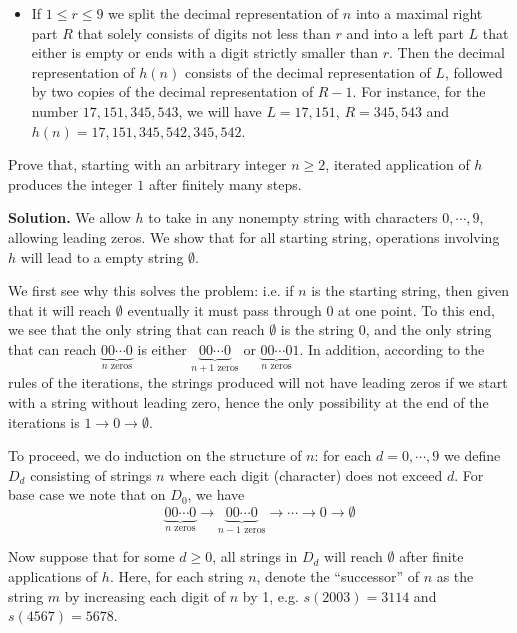 \documentclass[11pt,a4paper]{article}
\begin{document}
\begin{enumerate}
\begin{itemize}
    		\item If $1\leq r \leq 9$ we split the decimal representation of $n$ into a maximal right part $R$ that solely consists of digits not less than $r$ and into a left part $L$ that either is empty or ends with a digit strictly smaller than $r$. Then the decimal representation of $h(n)$ consists of the decimal representation of $L$, followed by two copies of the decimal representation of $R-1$. For instance, for the number $17,151,345,543$, we will have $L=17,151$, $R=345,543$ and $h(n)=17,151,345,542,345,542$.
    	\end{itemize}
        
        Prove that, starting with an arbitrary integer $n\geq 2$, iterated application of $h$ produces the integer $1$ after finitely many steps.
        
        \textbf{Solution.} 
        We allow $h$ to take in any nonempty string with characters $0, \cdots, 9$, allowing leading zeros. We show that for all starting string, operations involving $h$ will lead to a empty string $\emptyset$. 
        
        We first see why this solves the problem: i.e. if $n$ is the starting string, then given that it will reach $\emptyset$ eventually it must pass through 0 at one point. 
        To this end, we see that the only string that can reach $\emptyset$ is the string 0, 
        and the only string that can reach $\underbrace{00\cdots 0}_{n\text{ zeros}}$ is either $\underbrace{00\cdots 0}_{n + 1\text{ zeros}}$
        or $\underbrace{00\cdots 0}_{n\text{ zeros}}1$. 
        In addition, according to the rules of the iterations, the strings produced will not have leading zeros if we start with a string without leading zero, 
        hence the only possibility at the end of the iterations is $1\to 0\to\emptyset$. 
        
        To proceed, we do induction on the structure of $n$: 
        for each $d=0, \cdots, 9$ we define $D_d$ consisting of strings $n$ where each digit (character) does not exceed $d$. 
        For base case we note that on $D_0$, we have 
        \[
        \underbrace{00\cdots 0}_{n\text{ zeros}}\to \underbrace{00\cdots 0}_{n - 1\text{ zeros}}\to\cdots \to 0\to\emptyset
        \]
        
        Now suppose that for some $d\ge 0$, all strings in $D_d$ will reach $\emptyset$ after finite applications of $h$. 
        Here, for each string $n$, denote the ``successor'' of $n$ as the string $m$ by increasing each digit of $n$ by 1, 
        e.g. $s(2003)=3114$ and $s(4567)=5678$. 
        

\end{enumerate}
\end{document}
